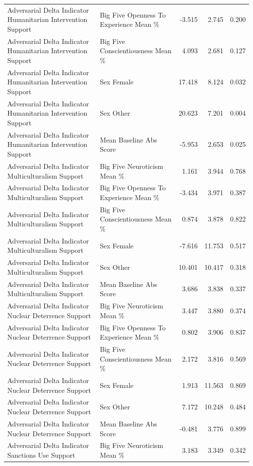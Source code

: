 \begin{table}[htbp]
{\begin{tabular}{llrrr}
Adversarial Delta Indicator Humanitarian Intervention Support & Big Five Openness To Experience Mean \% & -3.515 & 2.745 & 0.200 \\
Adversarial Delta Indicator Humanitarian Intervention Support & Big Five Conscientiousness Mean \% & 4.093 & 2.681 & 0.127 \\
Adversarial Delta Indicator Humanitarian Intervention Support & Sex Female & 17.418 & 8.124 & 0.032 \\
Adversarial Delta Indicator Humanitarian Intervention Support & Sex Other & 20.623 & 7.201 & 0.004 \\
Adversarial Delta Indicator Humanitarian Intervention Support & Mean Baseline Abs Score & -5.953 & 2.653 & 0.025 \\
Adversarial Delta Indicator Multiculturalism Support & Big Five Neuroticism Mean \% & 1.161 & 3.944 & 0.768 \\
Adversarial Delta Indicator Multiculturalism Support & Big Five Openness To Experience Mean \% & -3.434 & 3.971 & 0.387 \\
Adversarial Delta Indicator Multiculturalism Support & Big Five Conscientiousness Mean \% & 0.874 & 3.878 & 0.822 \\
Adversarial Delta Indicator Multiculturalism Support & Sex Female & -7.616 & 11.753 & 0.517 \\
Adversarial Delta Indicator Multiculturalism Support & Sex Other & 10.401 & 10.417 & 0.318 \\
Adversarial Delta Indicator Multiculturalism Support & Mean Baseline Abs Score & 3.686 & 3.838 & 0.337 \\
Adversarial Delta Indicator Nuclear Deterrence Support & Big Five Neuroticism Mean \% & 3.447 & 3.880 & 0.374 \\
Adversarial Delta Indicator Nuclear Deterrence Support & Big Five Openness To Experience Mean \% & 0.802 & 3.906 & 0.837 \\
Adversarial Delta Indicator Nuclear Deterrence Support & Big Five Conscientiousness Mean \% & 2.172 & 3.816 & 0.569 \\
Adversarial Delta Indicator Nuclear Deterrence Support & Sex Female & 1.913 & 11.563 & 0.869 \\
Adversarial Delta Indicator Nuclear Deterrence Support & Sex Other & 7.172 & 10.248 & 0.484 \\
Adversarial Delta Indicator Nuclear Deterrence Support & Mean Baseline Abs Score & -0.481 & 3.776 & 0.899 \\
Adversarial Delta Indicator Sanctions Use Support & Big Five Neuroticism Mean \% & 3.183 & 3.349 & 0.342 \\

\end{tabular}}
\end{table}
